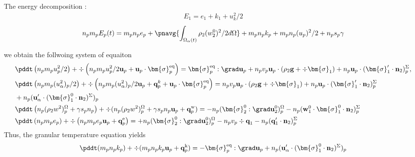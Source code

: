 The energy decomposition :
\begin{align*}
    E_1 = e_1 + k_1 + u_k^2/2
\end{align*}
\begin{equation*}
    n_p m_p E_p(t) 
    = m_p n_p e_p 
    + \pnavg{\int_{\Omega_\alpha(t)} \rho_2  (w_2^0)^2/2 d\Omega}
    + m_p n_p k_p
    + m_p n_p (u_p)^2/2
    + n_p s_p \gamma
\end{equation*}


we obtain the follwoing system of equaiton 
\begin{align*}
    &\pddt \left(n_p m_p u_p^2/ 2\right)
    + \div \left(n_p
    m_p u_p^2/ 2 \textbf{u}_p 
    + \textbf{u}_p \cdot \bm{\sigma}_p^\text{eq}
    \right)
    = 
     \bm{\sigma}_p^\text{eq}  :\grad \textbf{u}_p
    +  n_p v_p \textbf{u}_p \cdot 
    (\rho_2 \textbf{g} + \div \bm{\sigma}_1)
    + n_p \textbf{u}_p \cdot (\bm{\sigma}_1' \cdot \textbf{n}_2)^\Sigma_p,\\
    &\pddt \left(n_p m_p (u_\alpha^2)_p/ 2\right)
    + \div \left(n_p
    m_p (u_\alpha^2)_p/ 2 \textbf{u}_p 
    + \textbf{q}^k_p
    + \textbf{u}_p \cdot \bm{\sigma}_p^\text{eq}
    \right)
    = 
    n_p v_p \textbf{u}_p \cdot
    (\rho_2 \textbf{g} + \div \bm{\sigma}_1)
    + n_p\textbf{u}_p\cdot (\bm{\sigma}_1' \cdot \textbf{n}_2)^\Sigma_p\\
    &+n_p(\textbf{u}_\alpha'\cdot(\bm{\sigma}_1^0 \cdot \textbf{n}_2)^\Sigma)_p
    \\
    &\pddt \left(n_p (\rho_2 w^2 )_p^\Omega+\gamma s_p n_p\right)
    + \div 
    (n_p (\rho_2 w^2 )_p^\Omega+\gamma s_p n_p
    \textbf{u}_p 
    +  \textbf{q}_p^\text{w}
    )
    = 
    - n_p (\bm{\sigma}_2^0 : \grad\textbf{u}_2^0)^\Omega_p
    - n_p (\textbf{w}_1^0 \cdot \bm{\sigma}_1^0 \cdot  \textbf{n}_2)^\Sigma_p\\
    &\pddt \left(n_p m_p e_p\right)
    + \div \left(n_p
    m_p e_p \textbf{u}_p 
    +  \textbf{q}_p^\text{e}
    \right)
    = 
    + n_p (\bm{\sigma}_2^0 : \grad\textbf{u}_2^0)^\Omega_p
    - n_p v_p \div \textbf{q}_1
    - n_p (\textbf{q}_1'\cdot \textbf{n}_2)^\Sigma_p\\
\end{align*}
Thus, the granular temperature equation yields 
\begin{multline*}
    \pddt(m_p n_pk_p)
    + \div(m_pn_p k_p \textbf{u}_p 
    + \textbf{q}_p^\text{k})
    = 
     - \bm{\sigma}_p^\text{eq}  :\grad \textbf{u}_p
     + n_p (\textbf{u}_\alpha' \cdot (\bm{\sigma}_1^0 \cdot  \textbf{n}_2)^\Sigma)_p
    \\
\end{multline*}
